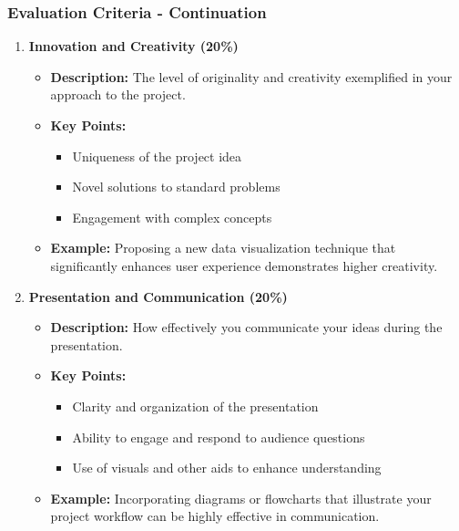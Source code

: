 \documentclass[aspectratio=169]{beamer}
\begin{document}
\begin{frame}[fragile]
  \frametitle{Evaluation Criteria - Continuation}
  \begin{enumerate}[resume]
    \item \textbf{Innovation and Creativity (20\%)}
    \begin{itemize}
      \item \textbf{Description:} The level of originality and creativity exemplified in your approach to the project.
      \item \textbf{Key Points:}
      \begin{itemize}
        \item Uniqueness of the project idea
        \item Novel solutions to standard problems
        \item Engagement with complex concepts
      \end{itemize}
      \item \textbf{Example:} Proposing a new data visualization technique that significantly enhances user experience demonstrates higher creativity.
    \end{itemize}

    \item \textbf{Presentation and Communication (20\%)}
    \begin{itemize}
      \item \textbf{Description:} How effectively you communicate your ideas during the presentation.
      \item \textbf{Key Points:}
      \begin{itemize}
        \item Clarity and organization of the presentation
        \item Ability to engage and respond to audience questions
        \item Use of visuals and other aids to enhance understanding
      \end{itemize}
      \item \textbf{Example:} Incorporating diagrams or flowcharts that illustrate your project workflow can be highly effective in communication.
    \end{itemize}
  \end{enumerate}
\end{frame}
\end{document}
